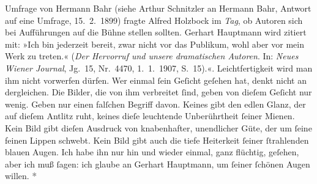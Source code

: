 \begin{ledgroupsized}[t]{13cm}
{{{{{                     Umfrage von Hermann Bahr (siehe Arthur Schnitzler an Hermann Bahr, Antwort auf eine Umfrage,
               15. 2. 1899) fragte
                     Alfred Holzbock im \emph{Tag}, ob 
                     Autoren sich bei Aufführungen auf die Bühne stellen sollten. Gerhart Hauptmann wird 
                     zitiert mit: »Ich bin jederzeit bereit, zwar nicht vor das Publikum, wohl aber vor mein Werk zu treten.«
                     (\emph{Der Hervorruf und unsere dramatischen Autoren}. In: \emph{Neues
                        Wiener Journal}, Jg. 15, Nr. 4470, 1. 1. 1907, S. 15).}}}\label{K_L03438-5h}«. Leichtfertigkeit wird man ihm nicht
                  vorwerfen dürfen. Wer einmal ſein Geſicht geſehen hat, denkt nicht an dergleichen.
                  Die Bilder, die von ihm verbreitet ſind, geben von dieſem Geſicht nur wenig. Geben
                  nur einen falſchen Begriff davon. Keines gibt den edlen Glanz, der auf dieſem
                  Antlitz ruht, keines dieſe leuchtende Unberührtheit ſeiner Mienen. Kein Bild gibt
                  dieſen Ausdruck von knabenhafter, unendlicher Güte, der um ſeine feinen Lippen
                  schwebt. Kein Bild gibt auch die tiefe Heiterkeit ſeiner ſtrahlenden blauen Augen.
                  Ich habe ihn nur hin und wieder einmal, ganz flüchtig, geſehen, aber ich muß
                  ſagen: ich glaube {\pb}an Gerhart Hauptmann, um ſeiner ſchönen Augen
                  willen.}}\pend
           \pstart
           \centering{}\textcolor{gray}{\textbf{*}}\pend

\end{ledgroupsized}

